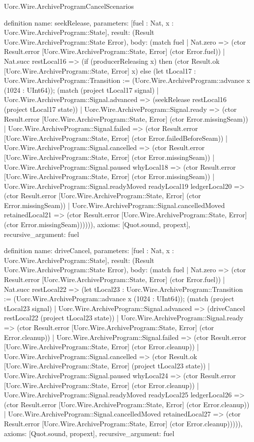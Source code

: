 \begin{lexlean}{Uorc.Wire.ArchiveProgramCancelScenarios}
\begin{semanticmodule}
definition{
  name: seekRelease,
  parameters: [fuel : Nat, x : Uorc.Wire.ArchiveProgram::State],
  result: (Result Uorc.Wire.ArchiveProgram::State Error),
  body: (match fuel
    | Nat.zero => (ctor Result.error [Uorc.Wire.ArchiveProgram::State, Error] (ctor Error.fuel))
    | Nat.succ restLocal16 => (if (producerReleasing x) then (ctor Result.ok [Uorc.Wire.ArchiveProgram::State, Error] x) else (let tLocal17 : Uorc.Wire.ArchiveProgram::Transition := (Uorc.Wire.ArchiveProgram::advance x (1024 : UInt64)); (match (project tLocal17 signal)
      | Uorc.Wire.ArchiveProgram::Signal.advanced => (seekRelease restLocal16 (project tLocal17 state))
      | Uorc.Wire.ArchiveProgram::Signal.ready => (ctor Result.error [Uorc.Wire.ArchiveProgram::State, Error] (ctor Error.missingSeam))
      | Uorc.Wire.ArchiveProgram::Signal.failed => (ctor Result.error [Uorc.Wire.ArchiveProgram::State, Error] (ctor Error.failedBeforeSeam))
      | Uorc.Wire.ArchiveProgram::Signal.cancelled => (ctor Result.error [Uorc.Wire.ArchiveProgram::State, Error] (ctor Error.missingSeam))
      | Uorc.Wire.ArchiveProgram::Signal.paused whyLocal18 => (ctor Result.error [Uorc.Wire.ArchiveProgram::State, Error] (ctor Error.missingSeam))
      | Uorc.Wire.ArchiveProgram::Signal.readyMoved readyLocal19 ledgerLocal20 => (ctor Result.error [Uorc.Wire.ArchiveProgram::State, Error] (ctor Error.missingSeam))
      | Uorc.Wire.ArchiveProgram::Signal.cancelledMoved retainedLocal21 => (ctor Result.error [Uorc.Wire.ArchiveProgram::State, Error] (ctor Error.missingSeam)))))),
  axioms: [Quot.sound, propext],
  recursive_argument: fuel
}

definition{
  name: driveCancel,
  parameters: [fuel : Nat, x : Uorc.Wire.ArchiveProgram::State],
  result: (Result Uorc.Wire.ArchiveProgram::State Error),
  body: (match fuel
    | Nat.zero => (ctor Result.error [Uorc.Wire.ArchiveProgram::State, Error] (ctor Error.fuel))
    | Nat.succ restLocal22 => (let tLocal23 : Uorc.Wire.ArchiveProgram::Transition := (Uorc.Wire.ArchiveProgram::advance x (1024 : UInt64)); (match (project tLocal23 signal)
      | Uorc.Wire.ArchiveProgram::Signal.advanced => (driveCancel restLocal22 (project tLocal23 state))
      | Uorc.Wire.ArchiveProgram::Signal.ready => (ctor Result.error [Uorc.Wire.ArchiveProgram::State, Error] (ctor Error.cleanup))
      | Uorc.Wire.ArchiveProgram::Signal.failed => (ctor Result.error [Uorc.Wire.ArchiveProgram::State, Error] (ctor Error.cleanup))
      | Uorc.Wire.ArchiveProgram::Signal.cancelled => (ctor Result.ok [Uorc.Wire.ArchiveProgram::State, Error] (project tLocal23 state))
      | Uorc.Wire.ArchiveProgram::Signal.paused whyLocal24 => (ctor Result.error [Uorc.Wire.ArchiveProgram::State, Error] (ctor Error.cleanup))
      | Uorc.Wire.ArchiveProgram::Signal.readyMoved readyLocal25 ledgerLocal26 => (ctor Result.error [Uorc.Wire.ArchiveProgram::State, Error] (ctor Error.cleanup))
      | Uorc.Wire.ArchiveProgram::Signal.cancelledMoved retainedLocal27 => (ctor Result.error [Uorc.Wire.ArchiveProgram::State, Error] (ctor Error.cleanup))))),
  axioms: [Quot.sound, propext],
  recursive_argument: fuel
}


\end{semanticmodule}
\end{lexlean}
